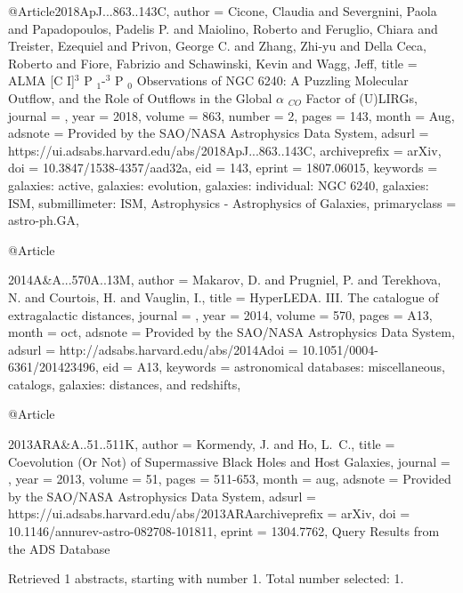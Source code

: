 \documentclass[longauth]{aa}
\begin{document}
{{{{{{{@Article{2018ApJ...863..143C,
  author        = {{Cicone}, Claudia and {Severgnini}, Paola and {Papadopoulos}, Padelis P. and {Maiolino}, Roberto and {Feruglio}, Chiara and {Treister}, Ezequiel and {Privon}, George C. and {Zhang}, Zhi-yu and {Della Ceca}, Roberto and {Fiore}, Fabrizio and {Schawinski}, Kevin and {Wagg}, Jeff},
  title         = {ALMA [C I]$^{3}$ P $_{1}$-$^{3}$ P $_{0}$ Observations of NGC 6240: A Puzzling Molecular Outflow, and the Role of Outflows in the Global {\ensuremath{\alpha}} $_{CO}$ Factor of (U)LIRGs},
  journal       = {\apj},
  year          = {2018},
  volume        = {863},
  number        = {2},
  pages         = {143},
  month         = {Aug},
  adsnote       = {Provided by the SAO/NASA Astrophysics Data System},
  adsurl        = {https://ui.adsabs.harvard.edu/abs/2018ApJ...863..143C},
  archiveprefix = {arXiv},
  doi           = {10.3847/1538-4357/aad32a},
  eid           = {143},
  eprint        = {1807.06015},
  keywords      = {galaxies: active, galaxies: evolution, galaxies: individual: NGC 6240, galaxies: ISM, submillimeter: ISM, Astrophysics - Astrophysics of Galaxies},
  primaryclass  = {astro-ph.GA},
}

@Article{2014A&A...570A..13M,
  author   = {{Makarov}, D. and {Prugniel}, P. and {Terekhova}, N. and {Courtois}, H. and {Vauglin}, I.},
  title    = {HyperLEDA. III. The catalogue of extragalactic distances},
  journal  = {\aap},
  year     = {2014},
  volume   = {570},
  pages    = {A13},
  month    = oct,
  adsnote  = {Provided by the SAO/NASA Astrophysics Data System},
  adsurl   = {http://adsabs.harvard.edu/abs/2014Adoi      = {10.1051/0004-6361/201423496},
  eid      = {A13},
  keywords = {astronomical databases: miscellaneous, catalogs, galaxies: distances, and redshifts},
}

@Article{2013ARA&A..51..511K,
  author        = {{Kormendy}, J. and {Ho}, L.~C.},
  title         = {Coevolution (Or Not) of Supermassive Black Holes and Host Galaxies},
  journal       = {\araa},
  year          = {2013},
  volume        = {51},
  pages         = {511-653},
  month         = aug,
  adsnote       = {Provided by the SAO/NASA Astrophysics Data System},
  adsurl        = {https://ui.adsabs.harvard.edu/abs/2013ARAarchiveprefix = {arXiv},
  doi           = {10.1146/annurev-astro-082708-101811},
  eprint        = {1304.7762},
}
Query Results from the ADS Database


Retrieved 1 abstracts, starting with number 1.  Total number selected: 1.

}}}}}}}}}
\end{document}
